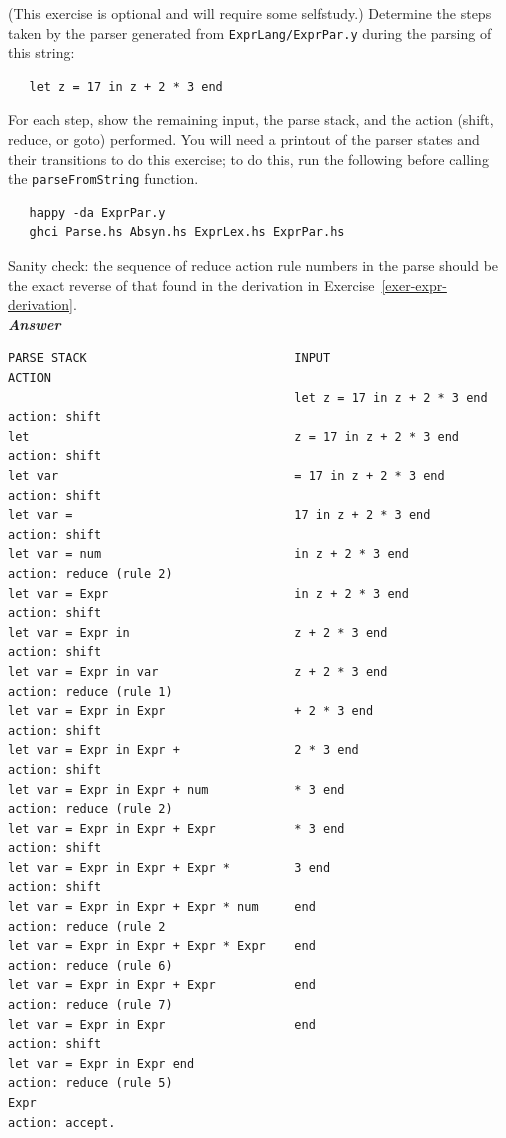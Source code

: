 \documentclass[a4paper]{article}
\begin{document}
\begin{exercise}\label{exer-expr-parse-steps}
  (This exercise is optional and will require some selfstudy.) Determine the steps taken by the parser generated from
  \texttt{ExprLang/ExprPar.y} during the parsing of this string:

{\codesetup\begin{verbatim}
   let z = 17 in z + 2 * 3 end 
\end{verbatim}} 

\noindent 
For each step, show the remaining input, the parse stack, and the
action (shift, reduce, or goto) performed.  You will need a printout
of the parser states and their transitions to do this exercise; to do this, run
the following before calling the \texttt{parseFromString} function.

{\codesetup\begin{verbatim}
   happy -da ExprPar.y
   ghci Parse.hs Absyn.hs ExprLex.hs ExprPar.hs
\end{verbatim}} 

Sanity check: the
sequence of reduce action rule numbers in the parse should be the
exact reverse of that found in the derivation in
Exercise~\ref{exer-expr-derivation}.\\


\noindent
\textbf{\emph{Answer}} 

{\codesetup\begin{verbatim}
PARSE STACK                             INPUT                           ACTION
   	                                    let z = 17 in z + 2 * 3 end     action: shift
let	                                    z = 17 in z + 2 * 3 end         action: shift
let var                                 = 17 in z + 2 * 3 end           action: shift
let var =                               17 in z + 2 * 3 end             action: shift
let var = num                           in z + 2 * 3 end                action: reduce (rule 2)
let var = Expr                          in z + 2 * 3 end                action: shift
let var = Expr in                       z + 2 * 3 end                   action: shift
let var = Expr in var                   z + 2 * 3 end                   action: reduce (rule 1)
let var = Expr in Expr                  + 2 * 3 end                     action: shift
let var = Expr in Expr +                2 * 3 end                       action: shift
let var = Expr in Expr + num            * 3 end                         action: reduce (rule 2)
let var = Expr in Expr + Expr           * 3 end                         action: shift
let var = Expr in Expr + Expr *         3 end                           action: shift
let var = Expr in Expr + Expr * num     end                             action: reduce (rule 2
let var = Expr in Expr + Expr * Expr    end                             action: reduce (rule 6)
let var = Expr in Expr + Expr           end                             action: reduce (rule 7)
let var = Expr in Expr                  end                             action: shift
let var = Expr in Expr end 	                                            action: reduce (rule 5)
Expr                                                                    action: accept.
\end{verbatim}} 



\end{exercise}
\end{document}
